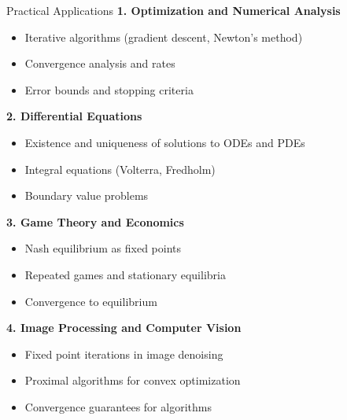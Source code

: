 \documentclass[aspectratio=169,10pt]{beamer}
\begin{document}
\begin{frame}{Practical Applications}
    \textbf{1. Optimization and Numerical Analysis}
    \begin{itemize}
        \item Iterative algorithms (gradient descent, Newton's method)
        \item Convergence analysis and rates
        \item Error bounds and stopping criteria
    \end{itemize}

    \vspace{0.3cm}
    \textbf{2. Differential Equations}
    \begin{itemize}
        \item Existence and uniqueness of solutions to ODEs and PDEs
        \item Integral equations (Volterra, Fredholm)
        \item Boundary value problems
    \end{itemize}

    \vspace{0.3cm}
    \textbf{3. Game Theory and Economics}
    \begin{itemize}
        \item Nash equilibrium as fixed points
        \item Repeated games and stationary equilibria
        \item Convergence to equilibrium
    \end{itemize}

    \vspace{0.3cm}
    \textbf{4. Image Processing and Computer Vision}
    \begin{itemize}
        \item Fixed point iterations in image denoising
        \item Proximal algorithms for convex optimization
        \item Convergence guarantees for algorithms
    \end{itemize}
\end{frame}
\end{document}
